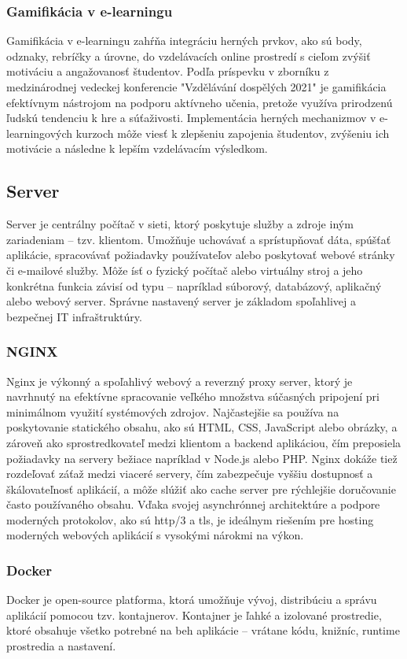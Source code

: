 \subsubsection{Gamifikácia v e-learningu}
Gamifikácia v e-learningu zahŕňa integráciu herných prvkov, ako sú body, odznaky, rebríčky a úrovne, do vzdelávacích online prostredí s cieľom zvýšiť motiváciu a angažovanosť študentov.
 Podľa príspevku v zborníku z medzinárodnej vedeckej konferencie "Vzdělávání dospělých 2021" \cite{gamifikacia} je gamifikácia efektívnym nástrojom na podporu aktívneho učenia, pretože využíva prirodzenú ľudskú tendenciu k hre a súťaživosti.
  Implementácia herných mechanizmov v e-learningových kurzoch môže viesť k zlepšeniu zapojenia študentov, zvýšeniu ich motivácie a následne k lepším vzdelávacím výsledkom.

\subsection{Server}
Server je centrálny počítač v sieti, ktorý poskytuje služby a zdroje iným zariadeniam – tzv. klientom. 
Umožňuje uchovávať a sprístupňovať dáta, spúšťať aplikácie, spracovávať požiadavky používateľov alebo poskytovať webové stránky či e-mailové služby.
 Môže ísť o fyzický počítač alebo virtuálny stroj a jeho konkrétna funkcia závisí od typu – napríklad súborový, databázový, aplikačný alebo webový server. 
 Správne nastavený server je základom spoľahlivej a bezpečnej IT infraštruktúry.\cite{server}
\subsubsection{NGINX}
Nginx\cite{nginx} je výkonný a spoľahlivý webový a reverzný proxy server, ktorý je navrhnutý na efektívne spracovanie veľkého množstva súčasných pripojení pri minimálnom využití systémových zdrojov. 
Najčastejšie sa používa na poskytovanie statického obsahu, ako sú HTML, CSS, JavaScript alebo obrázky, a zároveň ako sprostredkovateľ medzi klientom a backend aplikáciou, čím preposiela požiadavky na servery bežiace napríklad v Node.js alebo PHP. 
Nginx dokáže tiež rozdeľovať záťaž medzi viaceré servery, čím zabezpečuje vyššiu dostupnosť a škálovateľnosť aplikácií, a môže slúžiť ako cache server pre rýchlejšie doručovanie často používaného obsahu.
 Vďaka svojej asynchrónnej architektúre a podpore moderných protokolov, ako sú \acrshort{http}/3 a \acrshort{tls}, je ideálnym riešením pre hosting moderných webových aplikácií s vysokými nárokmi na výkon.
\subsubsection{Docker}
Docker je open-source platforma, ktorá umožňuje vývoj, distribúciu a správu aplikácií pomocou tzv. kontajnerov. 
Kontajner je ľahké a izolované prostredie, ktoré obsahuje všetko potrebné na beh aplikácie – vrátane kódu, knižníc, runtime prostredia a nastavení.

